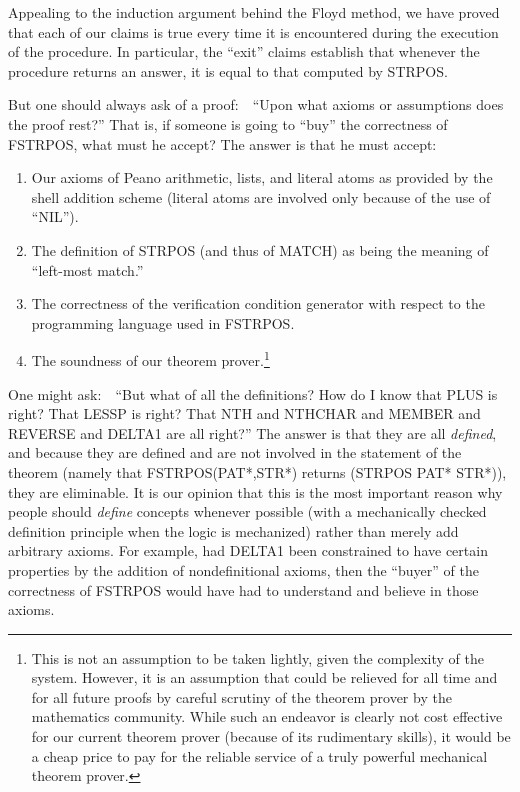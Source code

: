\documentclass[11pt]{book}
\newenvironment{pubbullet}{\begin{enumerate}}{\end{enumerate}}
\newcommand{\pubinlineunderline}[1]{\emph{#1}}
\begin{document}
Appealing to the induction argument behind the Floyd method, we have
proved that each of our claims is true every time it is encountered during
the execution of the procedure.  In particular, the ``exit'' claims
establish that whenever the procedure returns an answer, it is equal to
that computed by STRPOS.

But one should always ask of a proof:~~``Upon what axioms or assumptions
does the proof rest?''  That is, if someone is going to ``buy'' the
correctness of FSTRPOS, what must he accept?
The answer is that he must accept:
\begin{pubbullet}
\item Our axioms of Peano arithmetic, lists, and literal atoms
as provided by the shell addition scheme
(literal atoms are involved only because of the use of ``NIL'').
\item The definition of STRPOS (and thus of MATCH) as
being the meaning of ``left-most match.''
\item The correctness of the verification condition generator
with respect to the programming language used in FSTRPOS.
\item The soundness of our theorem prover.\footnote{This is not an assumption to be taken lightly, given the complexity of the system.  However, it is an assumption that could be relieved for all time and for all future proofs by careful scrutiny of the theorem prover by the mathematics community.  While such an endeavor is clearly not cost effective for our current theorem prover (because of its rudimentary skills), it would be a cheap price to pay for the reliable service of a truly powerful mechanical theorem prover.}
\end{pubbullet}
One might ask:~~``But what of all the definitions?  How do I know that
PLUS is right?  That LESSP is right?  That NTH and NTHCHAR and MEMBER
and REVERSE and DELTA1 are all right?''  The answer is that they are all
\pubinlineunderline{defined}, and because they are defined and are not involved
in the statement of the theorem (namely that FSTRPOS(PAT*,STR*) returns
(STRPOS PAT* STR*)), they are eliminable.  It is our opinion that
this is the most important reason why people should
\pubinlineunderline{define} concepts whenever possible (with a mechanically checked
definition principle when the logic is mechanized) rather than merely
add arbitrary axioms.  For example, had DELTA1 been
constrained to have certain properties by the addition of nondefinitional
axioms, then the ``buyer'' of the correctness of FSTRPOS would
have had
to understand and believe in those axioms.
\end{document}
